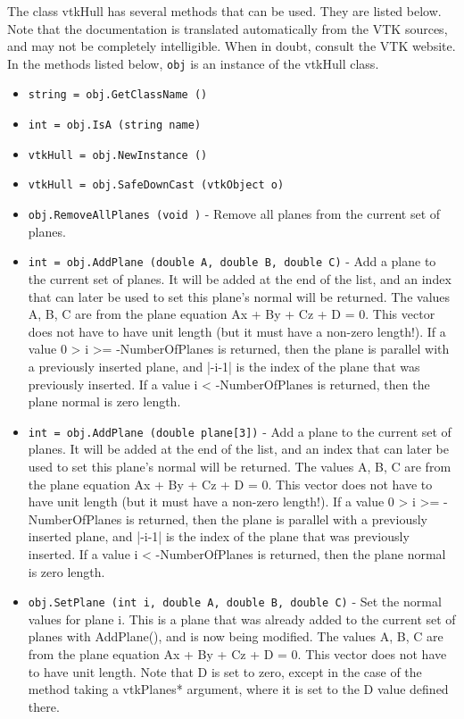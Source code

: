 The class vtkHull has several methods that can be used.
  They are listed below.
Note that the documentation is translated automatically from the VTK sources,
and may not be completely intelligible.  When in doubt, consult the VTK website.
In the methods listed below, \verb|obj| is an instance of the vtkHull class.
\begin{itemize}
\item  \verb|string = obj.GetClassName ()|

\item  \verb|int = obj.IsA (string name)|

\item  \verb|vtkHull = obj.NewInstance ()|

\item  \verb|vtkHull = obj.SafeDownCast (vtkObject o)|

\item  \verb|obj.RemoveAllPlanes (void )| -  Remove all planes from the current set of planes.  

\item  \verb|int = obj.AddPlane (double A, double B, double C)| -  Add a plane to the current set of planes. It will be added at the
 end of the list, and an index that can later be used to set this
 plane's normal will be returned. The values A, B, C are from the
 plane equation Ax + By + Cz + D = 0. This vector does not have to
 have unit length (but it must have a non-zero length!). If a value
 0 > i >= -NumberOfPlanes is returned, then the plane is parallel
 with a previously inserted plane, and |-i-1| is the index of the
 plane that was previously inserted. If a value i < -NumberOfPlanes
 is returned, then the plane normal is zero length.

\item  \verb|int = obj.AddPlane (double plane[3])| -  Add a plane to the current set of planes. It will be added at the
 end of the list, and an index that can later be used to set this
 plane's normal will be returned. The values A, B, C are from the
 plane equation Ax + By + Cz + D = 0. This vector does not have to
 have unit length (but it must have a non-zero length!). If a value
 0 > i >= -NumberOfPlanes is returned, then the plane is parallel
 with a previously inserted plane, and |-i-1| is the index of the
 plane that was previously inserted. If a value i < -NumberOfPlanes
 is returned, then the plane normal is zero length.

\item  \verb|obj.SetPlane (int i, double A, double B, double C)| -  Set the normal values for plane i. This is a plane that was already
 added to the current set of planes with AddPlane(), and is now being
 modified. The values A, B, C are from the plane equation 
 Ax + By + Cz + D = 0. This vector does not have to have unit length.
 Note that D is set to zero, except in the case of the method taking
 a vtkPlanes* argument, where it is set to the D value defined there.


\end{itemize}
